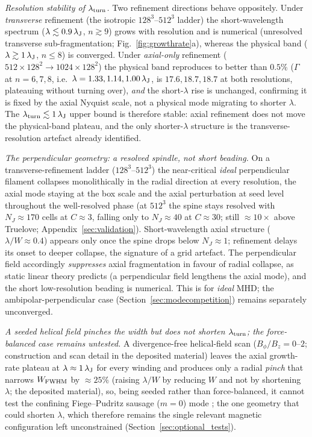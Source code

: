 \documentclass[usenatbib,twoside,twocolumn]{mnras}
\begin{document}
\emph{Resolution stability of $\lambda_{\rm turn}$.} Two refinement directions behave oppositely. Under \emph{transverse} refinement (the isotropic $128^3$--$512^3$ ladder) the short-wavelength spectrum ($\lambda\lesssim0.9\,\lambda_{\rm J}$, $n\gtrsim9$) grows with resolution and is numerical (unresolved transverse sub-fragmentation; Fig.~\ref{fig:growthrate}a), whereas the physical band ($\lambda\gtrsim1\,\lambda_{\rm J}$, $n\leq8$) is converged. Under \emph{axial-only} refinement ($512\times128^2\to1024\times128^2$) the physical band reproduces to better than $0.5\%$ ($\Gamma$ at $n=6,7,8$, i.e.\ $\lambda=1.33,1.14,1.00\,\lambda_{\rm J}$, is $17.6,18.7,18.7$ at both resolutions, plateauing without turning over), \emph{and} the short-$\lambda$ rise is unchanged, confirming it is fixed by the axial Nyquist scale, not a physical mode migrating to shorter $\lambda$. The $\lambda_{\rm turn}\lesssim1\,\lambda_{\rm J}$ upper bound is therefore stable: axial refinement does not move the physical-band plateau, and the only shorter-$\lambda$ structure is the transverse-resolution artefact already identified.

\emph{The perpendicular geometry: a resolved spindle, not short beading.} On a transverse-refinement ladder ($128^3$--$512^3$) the near-critical \emph{ideal} perpendicular filament collapses monolithically in the radial direction at every resolution, the axial mode staying at the box scale and the axial perturbation at seed level throughout the well-resolved phase (at $512^3$ the spine stays resolved with $N_J\approx170$ cells at $C\approx3$, falling only to $N_J\approx40$ at $C\approx30$; still $\approx10\times$ above Truelove; Appendix~\ref{sec:validation}). Short-wavelength axial structure ($\lambda/W\approx0.4$) appears only once the spine drops below $N_J\approx1$; refinement delays its onset to deeper collapse, the signature of a grid artefact. The perpendicular field accordingly \emph{suppresses} axial fragmentation in favour of radial collapse, as static linear theory predicts (a perpendicular field lengthens the axial mode), and the short low-resolution beading is numerical. This is for \emph{ideal} MHD; the ambipolar-perpendicular case (Section~\ref{sec:modecompetition}) remains separately unconverged.

\emph{A seeded helical field pinches the width but does not shorten $\lambda_{\rm turn}$; the force-balanced case remains untested.} A divergence-free helical-field scan ($B_\phi/B_z=0$--$2$; construction and scan detail in the deposited material) leaves the axial growth-rate plateau at $\lambda\approx1\,\lambda_{\rm J}$ for every winding and produces only a radial \emph{pinch} that narrows $W_{\rm FWHM}$ by $\approx25\%$ (raising $\lambda/W$ by reducing $W$ and not by shortening $\lambda$; the deposited material), so, being seeded rather than force-balanced, it cannot test the confining Fiege--Pudritz sausage ($m=0$) mode \citep{Fiege2000}; the one geometry that could shorten $\lambda$, which therefore remains the single relevant magnetic configuration left unconstrained (Section~\ref{sec:optional_tests}).
\end{document}
